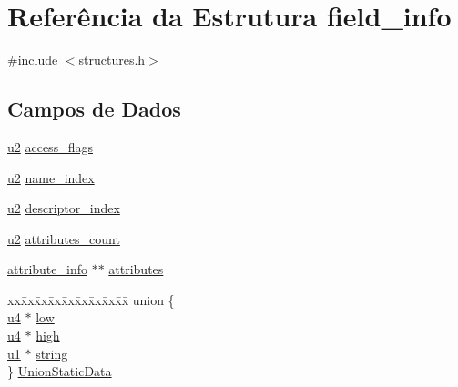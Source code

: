 \hypertarget{structfield__info}{}\section{Referência da Estrutura field\+\_\+info}
\label{structfield__info}


{\ttfamily \#include $<$structures.\+h$>$}

\subsection*{Campos de Dados}
\begin{DoxyCompactItemize}
\item 
\hyperlink{lista__operandos_8h_a732cde1300aafb73b0ea6c2558a7a54f}{u2} \hyperlink{structfield__info_aa622dc9a5b5353d2f3eb2f416dacab4b}{access\+\_\+flags}
\item 
\hyperlink{lista__operandos_8h_a732cde1300aafb73b0ea6c2558a7a54f}{u2} \hyperlink{structfield__info_a425e3ae85badd81c67ef00acca85ad9e}{name\+\_\+index}
\item 
\hyperlink{lista__operandos_8h_a732cde1300aafb73b0ea6c2558a7a54f}{u2} \hyperlink{structfield__info_a12dd492b7fb1d61da1ac14938d97b07f}{descriptor\+\_\+index}
\item 
\hyperlink{lista__operandos_8h_a732cde1300aafb73b0ea6c2558a7a54f}{u2} \hyperlink{structfield__info_a83bfa4ff84a608e3dbd1c3968ebe1b80}{attributes\+\_\+count}
\item 
\hyperlink{structattribute__info}{attribute\+\_\+info} $\ast$$\ast$ \hyperlink{structfield__info_a754de0f0fd6e62c413cca2979ca5debd}{attributes}
\item 
\begin{tabbing}
xx\=xx\=xx\=xx\=xx\=xx\=xx\=xx\=xx\=\kill
union \{\\
\>\hyperlink{lista__operandos_8h_ae5be1f726785414dd1b77d60df074c9d}{u4} $\ast$ \hyperlink{structfield__info_a578a358c12b99b512974ff10295582be}{low}\\
\>\hyperlink{lista__operandos_8h_ae5be1f726785414dd1b77d60df074c9d}{u4} $\ast$ \hyperlink{structfield__info_aa97ac1ab148b4dd06a21a0ab3d972209}{high}\\
\>\hyperlink{lista__operandos_8h_ad9f4cdb6757615aae2fad89dab3c5470}{u1} $\ast$ \hyperlink{structfield__info_a3628f44d66536cd28d270a4ec12514f3}{string}\\
\} \hyperlink{structfield__info_ad4f7c1536ad2cd1fe84816c97d2ce373}{UnionStaticData}\\

\end{tabbing}\end{DoxyCompactItemize}


